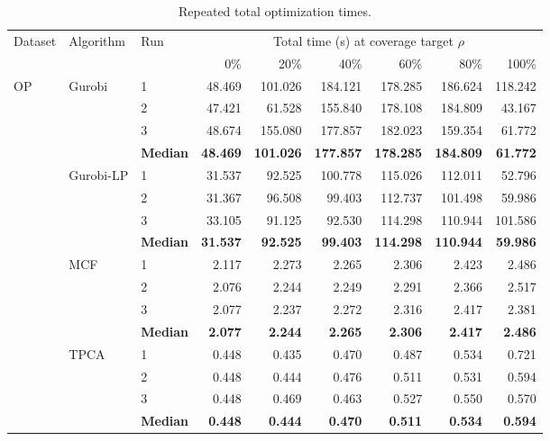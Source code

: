 \begin{table}[!t]
\centering
\caption{Repeated total optimization times.}\label{tab:repeat-times}
\fontsize{8}{9}\selectfont
\renewcommand{\arraystretch}{.92}
\setlength{\tabcolsep}{3.0pt}
\begin{tabular*}{\textwidth}{@{\extracolsep{\fill}}lllrrrrrr@{}}
\toprule
\multirow{2}{*}{Dataset} & \multirow{2}{*}{Algorithm} & \multirow{2}{*}{Run} & \multicolumn{6}{c}{Total time (s) at coverage target $\rho$}\\
\cmidrule(l){4-9}
 & & & 0\% & 20\% & 40\% & 60\% & 80\% & 100\%\\
\midrule
\multirow{20}{*}{OP} & \multirow{4}{*}{Gurobi} & 1 & 48.469 & 101.026 & 184.121 & 178.285 & 186.624 & 118.242 \\
 &  & 2 & 47.421 & 61.528 & 155.840 & 178.108 & 184.809 & 43.167 \\
 &  & 3 & 48.674 & 155.080 & 177.857 & 182.023 & 159.354 & 61.772 \\
 &  & \textbf{Median} & \textbf{48.469} & \textbf{101.026} & \textbf{177.857} & \textbf{178.285} & \textbf{184.809} & \textbf{61.772} \\
\addlinespace[1pt]
 & \multirow{4}{*}{Gurobi-LP} & 1 & 31.537 & 92.525 & 100.778 & 115.026 & 112.011 & 52.796 \\
 &  & 2 & 31.367 & 96.508 & 99.403 & 112.737 & 101.498 & 59.986 \\
 &  & 3 & 33.105 & 91.125 & 92.530 & 114.298 & 110.944 & 101.586 \\
 &  & \textbf{Median} & \textbf{31.537} & \textbf{92.525} & \textbf{99.403} & \textbf{114.298} & \textbf{110.944} & \textbf{59.986} \\
\addlinespace[1pt]
 & \multirow{4}{*}{MCF} & 1 & 2.117 & 2.273 & 2.265 & 2.306 & 2.423 & 2.486 \\
 &  & 2 & 2.076 & 2.244 & 2.249 & 2.291 & 2.366 & 2.517 \\
 &  & 3 & 2.077 & 2.237 & 2.272 & 2.316 & 2.417 & 2.381 \\
 &  & \textbf{Median} & \textbf{2.077} & \textbf{2.244} & \textbf{2.265} & \textbf{2.306} & \textbf{2.417} & \textbf{2.486} \\
\addlinespace[1pt]
 & \multirow{4}{*}{TPCA} & 1 & 0.448 & 0.435 & 0.470 & 0.487 & 0.534 & 0.721 \\
 &  & 2 & 0.448 & 0.444 & 0.476 & 0.511 & 0.531 & 0.594 \\
 &  & 3 & 0.448 & 0.469 & 0.463 & 0.527 & 0.550 & 0.570 \\
 &  & \textbf{Median} & \textbf{0.448} & \textbf{0.444} & \textbf{0.470} & \textbf{0.511} & \textbf{0.534} & \textbf{0.594} \\

\end{tabular*}
\end{table}
